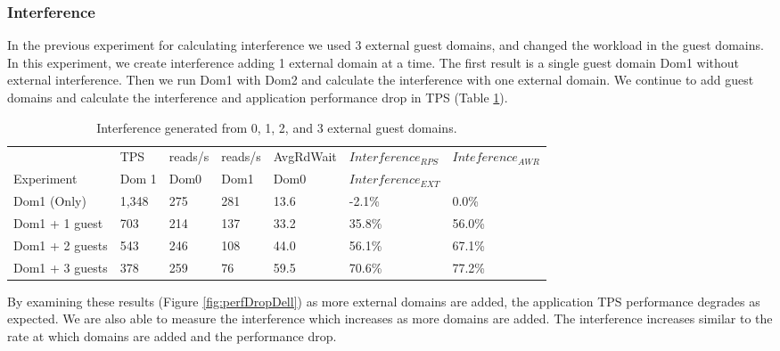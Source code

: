 \subsubsection{Interference}
In the previous experiment for calculating interference we used 3 external guest domains, and changed the workload in the guest domains.  In this experiment, we create interference adding 1 external domain at a time.  The first result is a single guest domain Dom1 without external interference.  Then we run Dom1 with Dom2 and calculate the interference with one external domain.  We continue to add guest domains and calculate the interference and application performance drop in TPS (Table \ref{tab:domains}).

\begin{table}[!h]
\begin{tabular}{ l l l l l l p{9cm} }
                   & TPS   & reads/s & reads/s & AvgRdWait & $Interference_{RPS}$ & $Inteference_{AWR}$ \\
	Experiment     & Dom 1 & Dom0     & Dom1     & Dom0      & $Interference_{EXT}$ &             \\
	\hline
    Dom1 (Only)     &1,348 & 275      & 281      & 13.6     &  -2.1\%  &   0.0\%   \\
    Dom1 + 1 guest  &  703 & 214      & 137      & 33.2     &  35.8\%  &   56.0\%  \\
    Dom1 + 2 guests &  543 & 246      & 108      & 44.0     &  56.1\%  &   67.1\%    \\
    Dom1 + 3 guests &  378 & 259      &  76      & 59.5     &  70.6\%  &   77.2\%  \\
\end{tabular}
\caption{Interference generated from 0, 1, 2, and 3 external guest domains.}
\label{tab:domains}
\end{table}

By examining these results (Figure \ref{fig:perfDropDell}) as more external domains are added, the application TPS performance degrades as expected.  We are also able to measure the interference which increases as more domains are added.  The interference increases similar to the rate at which domains are added and the performance drop.

